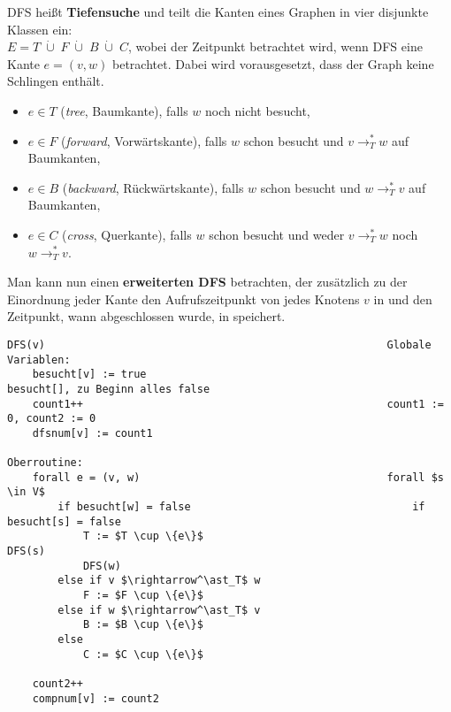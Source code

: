 \linie

DFS heißt \textbf{Tiefensuche} und teilt die Kanten eines Graphen in
vier disjunkte Klassen ein: \\
$E = T \;\dot{\cup}\; F \;\dot{\cup}\; B \;\dot{\cup}\; C$, wobei der
Zeitpunkt betrachtet wird, wenn DFS eine Kante $e = (v, w)$ betrachtet.
Dabei wird vorausgesetzt, dass der Graph keine Schlingen enthält.
\begin{itemize}
    \item $e \in T$ (\emph{tree}, Baumkante), falls $w$ noch nicht besucht,
    \item $e \in F$ (\emph{forward}, Vorwärtskante), falls $w$ schon besucht
    und $v \rightarrow^\ast_T w$ auf Baumkanten,
    \item $e \in B$ (\emph{backward}, Rückwärtskante), falls $w$ schon besucht
    und $w \rightarrow^\ast_T v$ auf Baumkanten,
    \item $e \in C$ (\emph{cross}, Querkante), falls $w$ schon besucht
    und weder $v \rightarrow^\ast_T w$ noch $w \rightarrow^\ast_T v$.
\end{itemize}

\linie

Man kann nun einen \textbf{erweiterten DFS} betrachten, der zusätzlich zu der
Einordnung jeder Kante den Aufrufszeitpunkt von  jedes Knotens
$v$ in  und den Zeitpunkt, wann  abgeschlossen
wurde, in  speichert.

\begin{lstlisting}
DFS(v)                                                      Globale Variablen:
    besucht[v] := true                                       besucht[], zu Beginn alles false
    count1++                                                count1 := 0, count2 := 0
    dfsnum[v] := count1
                                                            Oberroutine:
    forall e = (v, w)                                       forall $s \in V$
        if besucht[w] = false                                   if besucht[s] = false
            T := $T \cup \{e\}$                                                    DFS(s)
            DFS(w)
        else if v $\rightarrow^\ast_T$ w
            F := $F \cup \{e\}$
        else if w $\rightarrow^\ast_T$ v
            B := $B \cup \{e\}$
        else
            C := $C \cup \{e\}$

    count2++
    compnum[v] := count2
\end{lstlisting}

\linie
\pagebreak

